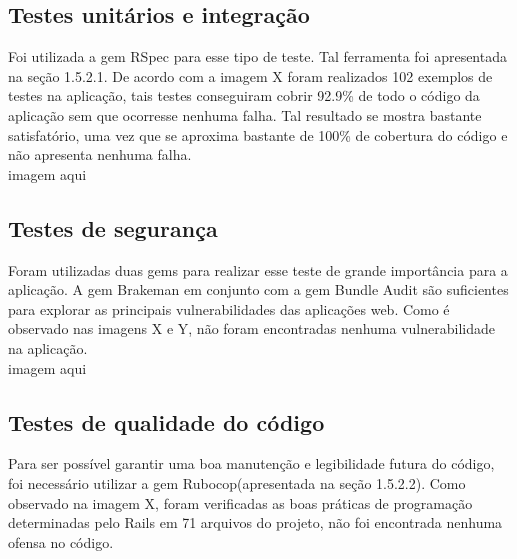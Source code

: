 \subsection{Testes unitários e integração}
Foi utilizada a gem RSpec para esse tipo de teste. Tal ferramenta foi apresentada na seção 1.5.2.1. De acordo com a imagem X foram realizados 102 exemplos de testes na aplicação, tais testes conseguiram cobrir 92.9\% de todo o código da aplicação sem que ocorresse nenhuma falha. Tal resultado se mostra bastante satisfatório, uma vez que se aproxima bastante de 100\% de cobertura do código e não apresenta nenhuma falha.
\\ imagem aqui
\subsection{Testes de segurança}
Foram utilizadas duas gems para realizar esse teste de grande importância para a aplicação. A gem Brakeman em conjunto com a gem Bundle Audit são suficientes para explorar as principais vulnerabilidades das aplicações web. Como é observado nas imagens X e Y, não foram encontradas nenhuma vulnerabilidade na aplicação.
\\ imagem aqui
\subsection{Testes de qualidade do código}
Para ser possível garantir uma boa manutenção e legibilidade futura do código, foi necessário utilizar a gem Rubocop(apresentada na seção 1.5.2.2). Como observado na imagem X, foram verificadas as boas práticas de programação determinadas pelo Rails em 71 arquivos do projeto, não foi encontrada nenhuma ofensa no código.